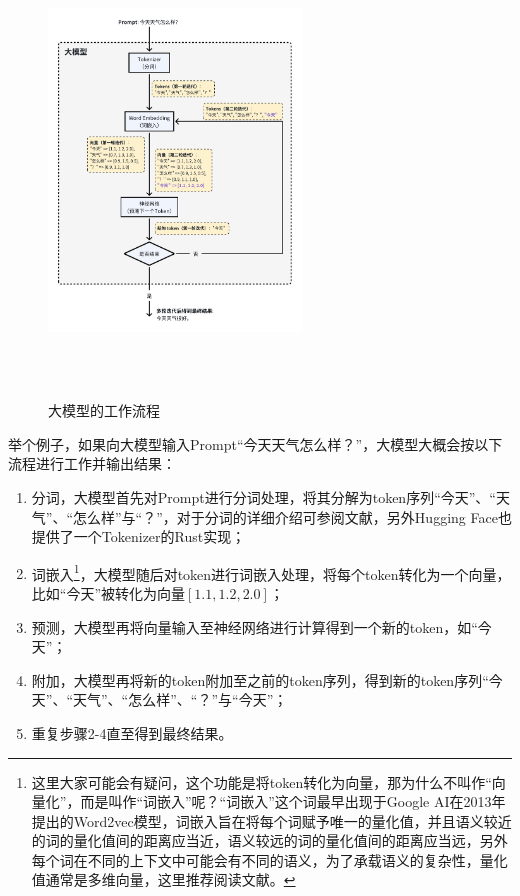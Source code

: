 \documentclass[letterpaper,11pt]{article}
\numberwithin{equation}{section}
\begin{document}
\begin{figure}[!htbp]
    \centering
    \includegraphics[width=0.6\textwidth, height=12cm, keepaspectratio]{../../assets/imgs/ai_share/llm_workflow.pdf}
    \caption{大模型的工作流程}
    \label{fig:llm-workflow}
\end{figure}

举个例子，如果向大模型输入Prompt“今天天气怎么样？”，大模型大概会按以下流程进行工作并输出结果：
\begin{enumerate}
    \item 分词，大模型首先对Prompt进行分词处理，将其分解为token序列“今天”、“天气”、“怎么样”与“？”，对于分词的详细介绍可参阅文献\cite{glan2023tokenizer}，另外Hugging Face也提供了一个Tokenizer的Rust实现\cite{huggingface_tokenizers}；
    \item 词嵌入\footnote{这里大家可能会有疑问，这个功能是将token转化为向量，那为什么不叫作“向量化”，而是叫作“词嵌入”呢？“词嵌入”这个词最早出现于Google AI在2013年提出的Word2vec模型\cite{mikolov2013efficientestimationwordrepresentations}，词嵌入旨在将每个词赋予唯一的量化值，并且语义较近的词的量化值间的距离应当近，语义较远的词的量化值间的距离应当远，另外每个词在不同的上下文中可能会有不同的语义，为了承载语义的复杂性，量化值通常是多维向量，这里推荐阅读文献\cite{constantine2023wordembedding}。}，大模型随后对token进行词嵌入处理，将每个token转化为一个向量，比如“今天”被转化为向量$[1.1, 1.2, 2.0]$；
    \item 预测，大模型再将向量输入至神经网络进行计算得到一个新的token，如“今天”；
    \item 附加，大模型再将新的token附加至之前的token序列，得到新的token序列“今天”、“天气”、“怎么样”、“？”与“今天”；
    \item 重复步骤2-4直至得到最终结果。
\end{enumerate}

\printbibliography[title={引用}]
\end{document}
